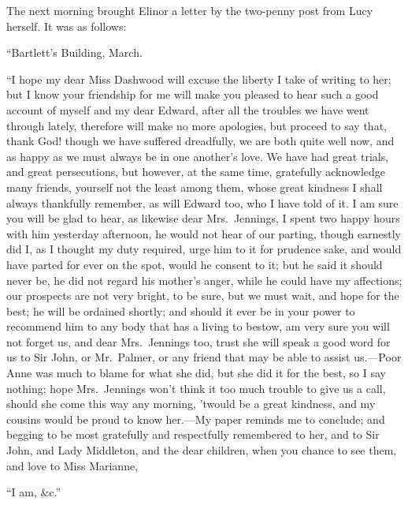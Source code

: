 The next morning brought Elinor a letter by the
two-penny post from Lucy herself.  It was as follows:

\bigskip
                    ``Bartlett's Building, March.
\medskip

     ``I hope my dear Miss Dashwood will excuse the
     liberty I take of writing to her; but I know your
     friendship for me will make you pleased to hear such
     a good account of myself and my dear Edward, after
     all the troubles we have went through lately,
     therefore will make no more apologies, but proceed
     to say that, thank God! though we have suffered
     dreadfully, we are both quite well now, and as happy
     as we must always be in one another's love.  We have
     had great trials, and great persecutions, but
     however, at the same time, gratefully acknowledge
     many friends, yourself not the least among them,
     whose great kindness I shall always thankfully
     remember, as will Edward too, who I have told of
     it.  I am sure you will be glad to hear, as likewise
     dear Mrs.\ Jennings, I spent two happy hours with
     him yesterday afternoon, he would not hear of our
     parting, though earnestly did I, as I thought my
     duty required, urge him to it for prudence sake,
     and would have parted for ever on the spot, would
     he consent to it; but he said it should never be,
     he did not regard his mother's anger, while he could
     have my affections; our prospects are not very
     bright, to be sure, but we must wait, and hope for
     the best; he will be ordained shortly; and should
     it ever be in your power to recommend him to any
     body that has a living to bestow, am very sure you
     will not forget us, and dear Mrs.\ Jennings too,
     trust she will speak a good word for us to Sir John,
     or Mr.\ Palmer, or any friend that may be able to
     assist us.---Poor Anne was much to blame for what
     she did, but she did it for the best, so I say
     nothing; hope Mrs.\ Jennings won't think it too much
     trouble to give us a call, should she come this way
     any morning, 'twould be a great kindness, and my
     cousins would be proud to know her.---My paper reminds
     me to conclude; and begging to be most gratefully
     and respectfully remembered to her, and to Sir John,
     and Lady Middleton, and the dear children, when you
     chance to see them, and love to Miss Marianne,

\medskip
                                      ``I am, \&c.''
\bigskip

